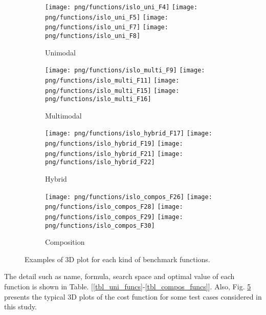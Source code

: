 \documentclass[../main.tex]{subfiles}
\begin{document}
\begin{figure}[!ht] 
   \centering
   \begin{subfigure}{0.24\textwidth}
  	 \texttt{[image: png/functions/islo\_uni\_F4]}
  	 \texttt{[image: png/functions/islo\_uni\_F5]}
  	 \texttt{[image: png/functions/islo\_uni\_F7]}
  	 \texttt{[image: png/functions/islo\_uni\_F8]}
  	\caption{Unimodal}
  	\label{subfig:uni}
  	\end{subfigure}
    \begin{subfigure}{0.24\textwidth}
   	\texttt{[image: png/functions/islo\_multi\_F9]}
  	 \texttt{[image: png/functions/islo\_multi\_F11]}
  	 \texttt{[image: png/functions/islo\_multi\_F15]}
  	 \texttt{[image: png/functions/islo\_multi\_F16]}
  	 \caption{Multimodal}
  	\label{subfig:multi}
  	\end{subfigure}
   \begin{subfigure}{0.24\textwidth}
   	\texttt{[image: png/functions/islo\_hybrid\_F17]}
  	\texttt{[image: png/functions/islo\_hybrid\_F19]}
  	\texttt{[image: png/functions/islo\_hybrid\_F21]}
  	\texttt{[image: png/functions/islo\_hybrid\_F22]}
  	 \caption{Hybrid}
  	\label{subfig:hybrid}
  	\end{subfigure}
  	\begin{subfigure}{0.24\textwidth}
  	 \texttt{[image: png/functions/islo\_compos\_F26]}
  	 \texttt{[image: png/functions/islo\_compos\_F28]}
  	 \texttt{[image: png/functions/islo\_compos\_F29]}
  	 \texttt{[image: png/functions/islo\_compos\_F30]}
  	 \caption{Composition}
  	\label{subfig:compos}
  	\end{subfigure}
  \caption{Examples of 3D plot for each kind of benchmark functions.} 
  \label{fig_functions} 
\end{figure}

The detail such as name, formula, search space and optimal value of each function is shown in Table. [\ref{tbl_uni_funcs}-\ref{tbl_compos_funcs}]. Also, Fig. \ref{fig_functions} presents the typical 3D plots of the cost function for some test cases considered in this study. 
\end{document}
